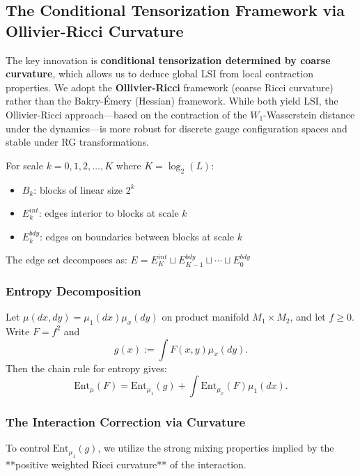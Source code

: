 \begin{theorem}[Uniform LSI - Clean Statement]
\subsection{The Conditional Tensorization Framework via Ollivier-Ricci Curvature}

The key innovation is \textbf{conditional tensorization determined by coarse curvature}, which allows us to deduce global LSI from local contraction properties. We adopt the \textbf{Ollivier-Ricci} framework (coarse Ricci curvature) rather than the Bakry-Émery (Hessian) framework. While both yield LSI, the Ollivier-Ricci approach---based on the contraction of the $W_1$-Wasserstein distance under the dynamics---is more robust for discrete gauge configuration spaces and stable under RG transformations.

\begin{definition}
For scale $k = 0, 1, 2, \ldots, K$ where $K = \log_2(L)$:
\begin{itemize}
\item $B_k$: blocks of linear size $2^k$
\item $E_k^{int}$: edges interior to blocks at scale $k$
\item $E_k^{bdy}$: edges on boundaries between blocks at scale $k$
\end{itemize}

The edge set decomposes as: $E = E_K^{int} \sqcup E_{K-1}^{bdy} \sqcup \cdots \sqcup E_0^{bdy}$
\end{definition}

\subsubsection{Entropy Decomposition}
Let $\mu(dx,dy) = \mu_1(dx)\mu_x(dy)$ on product manifold $M_1 \times M_2$, and let $f \ge 0$. Write $F=f^2$ and
\begin{equation}
g(x) := \int F(x,y) \mu_x(dy).
\end{equation}
Then the chain rule for entropy gives:
\begin{equation}
\mathrm{Ent}_{\mu}(F) = \mathrm{Ent}_{\mu_1}(g) + \int \mathrm{Ent}_{\mu_x}(F) \mu_1(dx).
\end{equation}

\subsubsection{The Interaction Correction via Curvature}
To control $\mathrm{Ent}_{\mu_1}(g)$, we utilize the strong mixing properties implied by the **positive weighted Ricci curvature** of the interaction.


\end{theorem}
